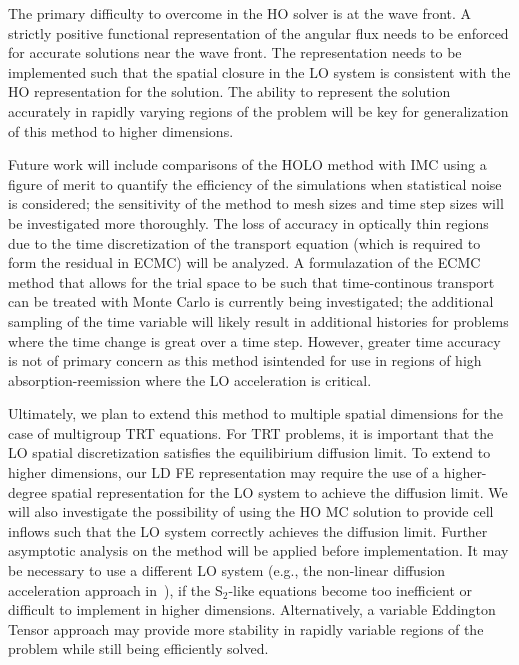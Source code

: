 \documentclass{mc2013}
\begin{document}
The primary difficulty to overcome in the HO
solver is at the wave front.  A strictly positive functional representation of the angular flux
needs to be enforced for accurate solutions near the wave front.  The representation needs to be implemented
such that the spatial closure in the LO system is consistent with the HO
representation for the solution.  The ability to represent the solution accurately in
rapidly varying regions of the problem will be key for generalization of this method
to higher dimensions.  


Future work will include comparisons of the HOLO method with IMC using a figure of
merit to quantify the efficiency of the simulations when statistical noise is
considered; the sensitivity of the method to mesh sizes and time step sizes will be
investigated more thoroughly.  The loss of accuracy in optically thin regions due to the time discretization of
the transport equation (which is required to form the residual in ECMC) will be
analyzed.  A formulazation of the ECMC method that allows for the trial space to be such that time-continous transport can
be treated with Monte Carlo is currently being investigated; the additional sampling
of the time variable will likely result in additional histories for problems where
the time change is great over a time step.  However, greater time accuracy is not of primary concern as this method isintended for use in
regions of high absorption-reemission where the LO acceleration is critical.

Ultimately, we plan to extend this method to multiple spatial dimensions for the 
case of multigroup TRT equations.  For TRT problems, it is important that
the LO spatial discretization satisfies the equilibirium diffusion limit.  To extend
to higher dimensions, our LD FE representation may require the use of a higher-degree
spatial representation for the LO system to achieve the diffusion
limit.  We will also
investigate the possibility of using the HO MC solution to provide cell inflows such
that the LO system correctly achieves the diffusion
limit.  Further asymptotic
analysis on the method will be applied before implementation.    It may be necessary to use a different LO system (e.g., the non-linear diffusion
acceleration approach in~\cite{rmc}), if the S$_2$-like equations become too
inefficient or difficult to implement in higher dimensions.  Alternatively, a
variable Eddington Tensor approach may provide more stability in rapidly variable
regions of the problem while still being
efficiently solved.
\end{document}
